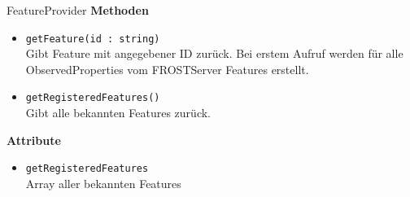 \begin{Class}{FeatureProvider}
    \textbf{Methoden}
    \begin{itemize}
        \item \texttt{getFeature(id : string)}
        \\Gibt Feature mit angegebener ID zurück. Bei erstem Aufruf werden für alle ObservedProperties vom FROSTServer Features erstellt. 
        \item \texttt{getRegisteredFeatures()}
        \\Gibt alle bekannten Features zurück.
    \end{itemize}
    \textbf{Attribute}
    \begin{itemize}
        \item \texttt{getRegisteredFeatures}
        \\Array aller bekannten Features
    \end{itemize}
\end{Class}

